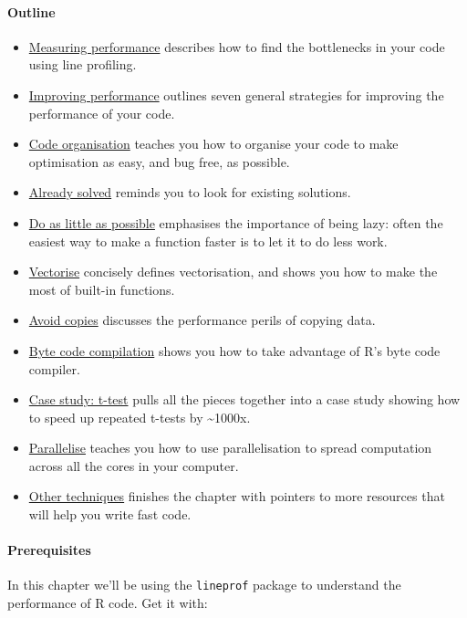 \paragraph{Outline}

\begin{itemize}
\item
  \hyperref[measure-perf]{Measuring performance} describes how to find
  the bottlenecks in your code using line profiling.
\item
  \hyperref[improve-perf]{Improving performance} outlines seven general
  strategies for improving the performance of your code.
\item
  \hyperref[code-organisation]{Code organisation} teaches you how to
  organise your code to make optimisation as easy, and bug free, as
  possible.
\item
  \hyperref[already-solved]{Already solved} reminds you to look for
  existing solutions.
\item
  \hyperref[be-lazy]{Do as little as possible} emphasises the importance
  of being lazy: often the easiest way to make a function faster is to
  let it to do less work.
\item
  \hyperref[vectorise]{Vectorise} concisely defines vectorisation, and
  shows you how to make the most of built-in functions.
\item
  \hyperref[avoid-copies]{Avoid copies} discusses the performance perils
  of copying data.
\item
  \hyperref[byte-code]{Byte code compilation} shows you how to take
  advantage of R's byte code compiler.
\item
  \hyperref[t-test]{Case study: t-test} pulls all the pieces together
  into a case study showing how to speed up repeated t-tests by
  \textasciitilde{}1000x.
\item
  \hyperref[parallelise]{Parallelise} teaches you how to use
  parallelisation to spread computation across all the cores in your
  computer.
\item
  \hyperref[more-techniques]{Other techniques} finishes the chapter with
  pointers to more resources that will help you write fast code.
\end{itemize}

\paragraph{Prerequisites}

In this chapter we'll be using the \texttt{lineprof} package to
understand the performance of R code. Get it with:

